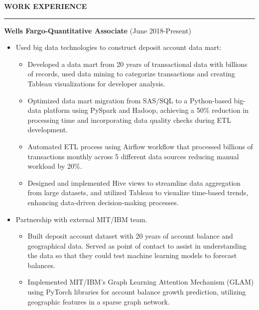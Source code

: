 \documentclass[a4paper,10pt]{article}
\begin{document}
\noindent
\textbf{WORK EXPERIENCE}\vspace{-3mm}\\
\hrule height 2pt
\vspace{2mm}
\textbf{Wells Fargo-Quantitative Associate} (June 2018-Present)
\begin{itemize}
\item Used big data technologies to construct deposit account data mart:
  \begin{itemize}[label=\textbullet]
  \item Developed a data mart from 20 years of transactional data with billions of records, used data mining to categorize transactions and creating Tableau visualizations for developer analysis.
  \end{itemize}
 \begin{itemize}[label=\textbullet]
  \item Optimized data mart migration from SAS/SQL to a Python-based big-data platform using PySpark and Hadoop, achieving a 50\% reduction in processing time and incorporating data quality checks during ETL development.
  \end{itemize}
 \begin{itemize}[label=\textbullet]
  \item Automated ETL process using Airflow workflow that processed billions of transactions monthly across 5 different data sources reducing manual workload by 20\%.
  \end{itemize}
 \begin{itemize}[label=\textbullet]
  \item Designed and implemented Hive views to streamline data aggregation from large datasets, and utilized Tableau to visualize time-based trends, enhancing data-driven decision-making processes.
  \end{itemize}
\item Partnership with external MIT/IBM team.
 \begin{itemize}[label=\textbullet]
  \item Built deposit account dataset with 20 years of account balance and geographical data. Served as point of contact to assist in understanding the data so that they could test machine learning models to forecast balances.
  \end{itemize}
 \begin{itemize}[label=\textbullet]
  \item Implemented MIT/IBM's Graph Learning Attention Mechanism (GLAM) using PyTorch libraries for account balance growth prediction, utilizing geographic features in a sparse graph network.

\end{itemize}
\end{itemize}
\end{document}
